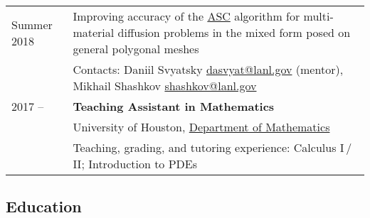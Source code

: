 \documentclass[a4paper,12pt]{article}
\begin{document}
\begin{longtable}{ l >{\raggedright\arraybackslash}p{15cm} }
		Summer 2018
			& Improving accuracy of the \href{https://www.researchgate.net/publication/318300724_Approximate_static_condensation_algorithm_for_solving_multi-material_diffusion_problems_on_meshes_non-aligned_with_material_interfaces}{ASC} algorithm for multi-material diffusion problems in the mixed form posed on general polygonal meshes\vspace{1mm}\\
			& Contacts: Daniil Svyatsky \href{mailto:dasvyat@lanl.gov}{dasvyat@lanl.gov} (mentor), Mikhail Shashkov \href{mailto:shashkov@lanl.gov}{shashkov@lanl.gov}\vspace{3mm}\\
		2017 -- 
			& \textbf{Teaching Assistant in Mathematics}\vspace{1mm}\\
			& University of Houston, \href{http://www.uh.edu/nsm/math/}{Department of Mathematics}\vspace{1mm}\\
			& Teaching, grading, and tutoring experience: Calculus I\,/\,II; Introduction to PDEs
	\end{longtable}

	\subsection*{Education}
\end{document}
